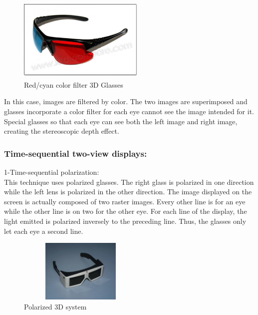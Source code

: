 \begin{figure}[h!]
\begin{center}
\begin{minipage}{1\linewidth}
\centering\includegraphics[width=6cm,height=40mm]{image/1.jpg}
\caption{Red/cyan color filter 3D Glasses\cite{ViewingOn3D}}
\end{minipage}
\end{center}
\end{figure}

In this case, images are filtered by color. The two images are superimposed and glasses incorporate a color filter for each eye cannot see the image intended for it.\\
Special glasses so that each eye can see both the left image and right image, creating the stereoscopic depth effect.

\subsubsection{Time-sequential two-view displays:}

1-Time-sequential polarization:\\
This technique uses polarized glasses. The right glass is polarized in one direction while the left lens is polarized in the other direction. The image displayed on the screen is actually composed of two raster images. Every other line is for an eye while the other line is on two for the other eye. For each line of the display, the light emitted is polarized inversely to the preceding line. Thus, the glasses only let each eye a second line.
\clearpage
\begin{figure}[h!]
\begin{center}
\begin{minipage}{1\linewidth}
\centering\includegraphics[width=6cm,height=30mm]{image/2.jpg}
\caption{Polarized 3D system\cite{Polarized3D}}
\end{minipage}
\end{center}
\end{figure}


